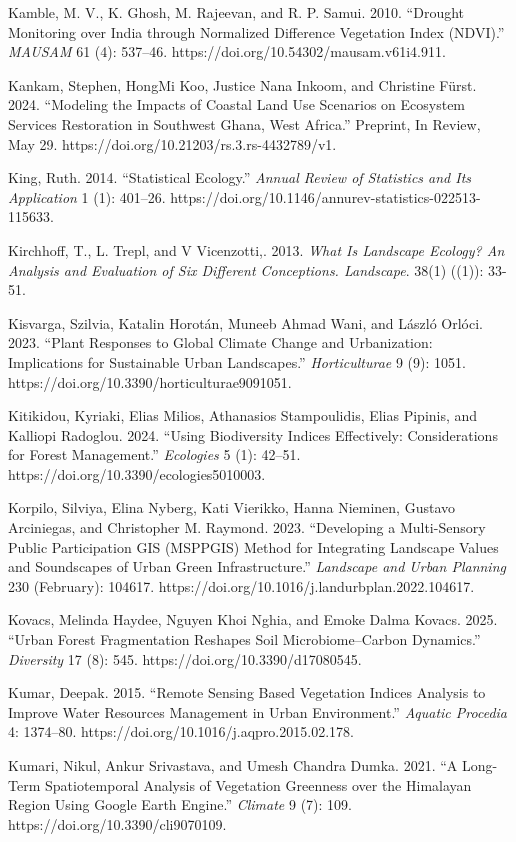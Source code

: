 Kamble, M. V., K. Ghosh, M. Rajeevan, and R. P. Samui. 2010. ``Drought Monitoring over India through Normalized Difference Vegetation Index (NDVI).'' \emph{MAUSAM} 61 (4): 537--46. https://doi.org/10.54302/mausam.v61i4.911.

Kankam, Stephen, HongMi Koo, Justice Nana Inkoom, and Christine Fürst. 2024. ``Modeling the Impacts of Coastal Land Use Scenarios on Ecosystem Services Restoration in Southwest Ghana, West Africa.'' Preprint, In Review, May 29. https://doi.org/10.21203/rs.3.rs-4432789/v1.

King, Ruth. 2014. ``Statistical Ecology.'' \emph{Annual Review of Statistics and Its Application} 1 (1): 401--26. https://doi.org/10.1146/annurev-statistics-022513-115633.

Kirchhoff, T., L. Trepl, and V Vicenzotti,. 2013. \emph{What Is Landscape Ecology? An Analysis and Evaluation of Six Different Conceptions. Landscape}. 38(1) ((1)): 33-51.

Kisvarga, Szilvia, Katalin Horotán, Muneeb Ahmad Wani, and László Orlóci. 2023. ``Plant Responses to Global Climate Change and Urbanization: Implications for Sustainable Urban Landscapes.'' \emph{Horticulturae} 9 (9): 1051. https://doi.org/10.3390/horticulturae9091051.

Kitikidou, Kyriaki, Elias Milios, Athanasios Stampoulidis, Elias Pipinis, and Kalliopi Radoglou. 2024. ``Using Biodiversity Indices Effectively: Considerations for Forest Management.'' \emph{Ecologies} 5 (1): 42--51. https://doi.org/10.3390/ecologies5010003.

Korpilo, Silviya, Elina Nyberg, Kati Vierikko, Hanna Nieminen, Gustavo Arciniegas, and Christopher M. Raymond. 2023. ``Developing a Multi-Sensory Public Participation GIS (MSPPGIS) Method for Integrating Landscape Values and Soundscapes of Urban Green Infrastructure.'' \emph{Landscape and Urban Planning} 230 (February): 104617. https://doi.org/10.1016/j.landurbplan.2022.104617.

Kovacs, Melinda Haydee, Nguyen Khoi Nghia, and Emoke Dalma Kovacs. 2025. ``Urban Forest Fragmentation Reshapes Soil Microbiome--Carbon Dynamics.'' \emph{Diversity} 17 (8): 545. https://doi.org/10.3390/d17080545.

Kumar, Deepak. 2015. ``Remote Sensing Based Vegetation Indices Analysis to Improve Water Resources Management in Urban Environment.'' \emph{Aquatic Procedia} 4: 1374--80. https://doi.org/10.1016/j.aqpro.2015.02.178.

Kumari, Nikul, Ankur Srivastava, and Umesh Chandra Dumka. 2021. ``A Long-Term Spatiotemporal Analysis of Vegetation Greenness over the Himalayan Region Using Google Earth Engine.'' \emph{Climate} 9 (7): 109. https://doi.org/10.3390/cli9070109.

